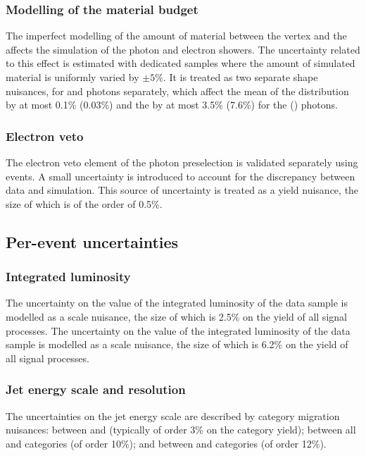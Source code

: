 \subsubsection{Modelling of the material budget}
The imperfect modelling of the amount of material between the vertex and the \ECAL affects the simulation of the photon and electron showers. The uncertainty related to this effect is estimated with dedicated samples where the amount of simulated material is uniformly varied by $\pm 5\%$. It is treated as two separate shape nuisances, for \EB and \EE photons separately, which affect the mean of the \mgg distribution by at most 0.1\% (0.03\%) and the \effSigma by at most 3.5\% (7.6\%) for the \EB (\EE) photons.

\subsubsection{Electron veto}
The electron veto element of the photon preselection is validated separately using \Zmmg events. A small uncertainty is introduced to account for the discrepancy between data and simulation. This source of uncertainty is treated as a yield nuisance, the size of which is of the order of 0.5\%. 

\subsection{Per-event uncertainties}

\subsubsection{Integrated luminosity}
\ifNewAnalysis
The uncertainty on the value of the integrated luminosity of the data sample is modelled as a scale nuisance, the size of which is 2.5\% on the yield of all signal processes. 
\else
The uncertainty on the value of the integrated luminosity of the data sample is modelled as a scale nuisance, the size of which is 6.2\% on the yield of all signal processes. 
\fi

\subsubsection{Jet energy scale and resolution}
The uncertainties on the jet energy scale are described by category migration nuisances: between  and  (typically of order 3\% on the category yield); between all \VBF and \Untagged categories (of order 10\%); and between \TTHTag and \Untagged categories (of order 12\%).

